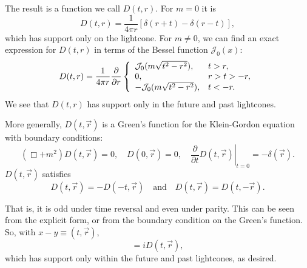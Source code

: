 \documentclass[11pt]{article}
\theoremstyle{definition}
\begin{document}
The result is a function we call \(D(t,r)\). For \(m=0\) it is
\begin{equation}
D(t,r)=\frac{1}{4\pi r}\left[\delta(r+t)-\delta(r-t)\right],
\end{equation}
which has support only on the lightcone. For \(m\neq 0\), we can find an exact expression for \(D(t,r)\) in terms of the Bessel function \(\mathcal{J}_{0}(x)\):
\begin{equation}
D(t,r)=\frac{1}{4\pi r}\frac{\partial}{\partial r}\left\{\begin{array}[]{ll} \mathcal{J}_{0}(m\sqrt{t^{2}-r^{2}}),&t>r,\\ 0,&r>t>-r,\\ -\mathcal{J}_{0}(m\sqrt{t^{2}-r^{2}}),&t<-r.\end{array}\right.
\end{equation}
We see that \(D(t,r)\) has support only in the future and past lightcones.

More generally, \(D(t,\vec{r})\) is a Green's function for the Klein-Gordon equation with boundary conditions:
\begin{equation}
(\Box+m^{2})D(t,\vec{r})=0,\quad D(0,\vec{r})=0,\quad\left.\frac{\partial}{ \partial t}D(t,\vec{r})\right|_{t=0}=-\delta(\vec{r}).
\end{equation}
\(D(t,\vec{r})\) satisfies
\begin{equation}
D(t,\vec{r})=-D(-t,\vec{r})\quad\textrm{and}\quad D(t,\vec{r})=D(t,-\vec{r}).
\end{equation}

That is, it is odd under time reversal and even under parity. This can be seen from the explicit form, or from the boundary condition on the Green's function. So, with \(x-y\equiv(t,\vec{r})\),
\begin{equation}
[\phi(x),\phi(y)]=iD(t,\vec{r}),
\end{equation}
which has support only within the future and past lightcones, as desired.
\end{document}
